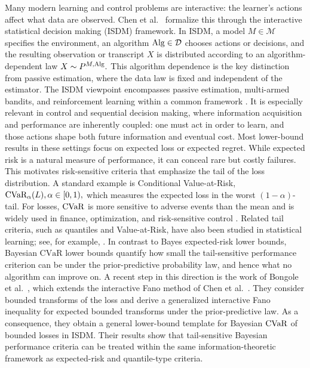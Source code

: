 \documentclass[conference]{IEEEtran}
\begin{document}
Many modern learning and control problems are interactive: the learner's actions affect what data are observed. Chen et al.~\cite{chen2024assouad} formalize this through the interactive statistical decision making (ISDM) framework. In ISDM, a model \(M\in\mathcal{M}\) specifies the environment, an algorithm \(\textup{Alg}\in\mathcal{D}\) chooses actions or decisions, and the resulting observation or transcript \(X\) is distributed according to an algorithm-dependent law
\(
X\sim P^{M,\textup{Alg}}.
\)
This algorithm dependence is the key distinction from passive estimation, where the data law is fixed and independent of the estimator. The ISDM viewpoint encompasses passive estimation, multi-armed bandits, and reinforcement learning within a common framework \cite{chen2024assouad,lattimore2020bandit,sutton2018reinforcement}. It is especially relevant in control and sequential decision making, where information acquisition and performance are inherently coupled: one must act in order to learn, and those actions shape both future information and eventual cost. Most lower-bound results in these settings focus on expected loss or expected regret. While expected risk is a natural measure of performance, it can conceal rare but costly failures. This motivates risk-sensitive criteria that emphasize the tail of the loss distribution. A standard example is Conditional Value-at-Risk,
\(
\textup{CVaR}_\alpha(L),
 \alpha\in[0,1),
\)
which measures the expected loss in the worst \((1-\alpha)\)-tail. For losses, \(\textup{CVaR}\) is more sensitive to adverse events than the mean and is widely used in finance, optimization, and risk-sensitive control \cite{rockafellar2000optimization,rockafellar2002general,acerbi2002expected}. Related tail criteria, such as quantiles and Value-at-Risk, have also been studied in statistical learning; see, for example, \cite{ma2024highprobability}. In contrast to Bayes expected-risk lower bounds, Bayesian \(\mathrm{CVaR}\) lower bounds quantify how small the tail-sensitive
performance criterion can be under the prior-predictive probability law, and hence what no algorithm can improve on. A recent step in this direction is the work of Bongole et al.~\cite{bongole2026generalizing}, which extends the interactive Fano method of Chen et al.~\cite{chen2024assouad}. They consider bounded transforms of the loss and derive a generalized interactive Fano inequality for expected bounded transforms under the prior-predictive law. As a consequence, they obtain a general lower-bound template for Bayesian \(\textup{CVaR}\) of bounded losses in ISDM. Their results show that tail-sensitive Bayesian performance criteria can be treated within the same information-theoretic framework as expected-risk and quantile-type criteria.
\end{document}
